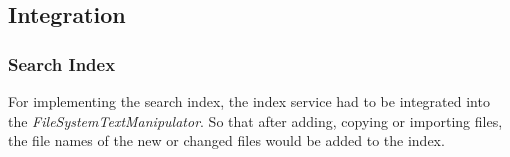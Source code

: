 \documentclass[JCDReport.tex]{subfiles}
\begin{document}
\subsection{Integration}

\subsubsection{Search Index}
For implementing the search index, the index service had to be integrated into the \textit{FileSystemTextManipulator}. So that after adding, copying or importing files, the file names of the new or changed files would be added to the index.
\end{document}
